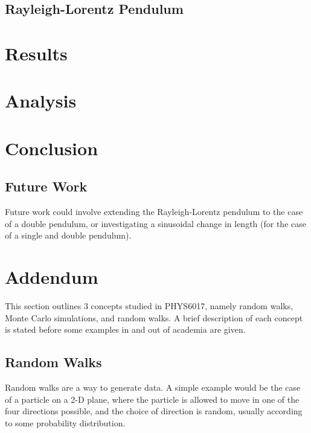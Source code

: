 \documentclass[10pt, twocolumn]{article}
\begin{document}
\subsection{Rayleigh-Lorentz Pendulum}


\section{Results}

\section{Analysis}
\section{Conclusion}

\subsection{Future Work}
Future work could involve extending the Rayleigh-Lorentz pendulum to the case of a double pendulum, or investigating a sinusoidal change in length (for the case of a single and double pendulum). 
\newpage
\section{Addendum} %
This section outlines 3 concepts studied in PHYS6017, namely random walks, Monte Carlo simulations, and random walks. A brief description of each concept is stated before some examples in and out of academia are given.
\subsection{Random Walks} %
Random walks are a way to generate data. A simple example would be the case of a particle on a 2-D plane, where the particle is allowed to move in one of the four directions possible, and the choice of direction is random, usually according to some probability distribution.
\end{document}
